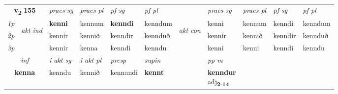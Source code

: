 \noindent
\begin{tabular}{lllllllllll} \toprule
\multicolumn{2}{c}{\textbf{v{\textsubscript{2}}} \Large{\textbf{155}}}  &  \textit{praes sg}  & \textit{praes pl}  &\textit{ pf sg} & \textit{pf pl} &  &  \textit{praes sg}  & \textit{praes pl}  & \textit{pf sg} & \textit{pf pl } \\*
	\cmidrule{3-6} \cmidrule{8-11}
 {\textit{1p}} & \multirow{3}{*}{\begin{turn}{90}\textit{akt ind}\end{turn}} & \textbf{kenni} & kennum & \textbf{kenndi} & kenndum & \multirow{3}{*}{\begin{turn}{90}\textit{akt con}\end{turn}} &kenni & kennum & kenndi & kenndum\\*
 {\textit{2p}} &  &  kennir  & kennið & kenndir & kennduð & & kennir & kennið & kenndir & kennduð \\*
{\textit{3p}} &  & kennir & kenna & kenndi & kenndu & & kenni & kenni& kenndi & kenndu \\*
\cmidrule{3-6} \cmidrule{8-11}

   \multicolumn{2}{c}{\textit{inf}}  & \textit{i akt sg} & \textit{i akt pl}   & \textit{presp} & \textit{supin}  && \textit{pp m} \\*
  \multicolumn{2}{c}{\textbf{kenna}} & kenndu  & kennið   & kennandi &  \textbf{kennt}  && \specialcell{\textbf{kenndur} \\ adj\textbf{\textsubscript{2-14}}} \\*
\end{tabular}

